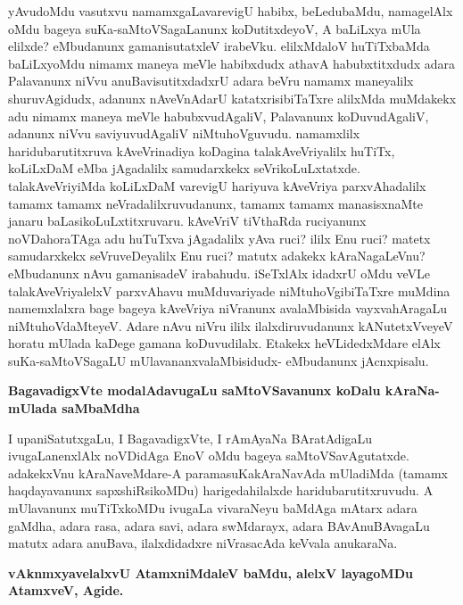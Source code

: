 \noindent
yAvudoMdu vasutxvu namamxgaLavarevigU habibx, beLedubaMdu, namagelAlx oMdu bageya suKa-\-saMtoVSagaLanunx koDutitxdeyoV, A baLiLxya mUla elilxde? eMbudanunx gamanisutatxleV irabeVku. elilxMdaloV huTiTxbaMda baLiLxyoMdu nimamx maneya meVle habibxdudx athavA habubxtitxdudx adara Pala\-vanunx niVvu anuBavisutitxdadxrU adara beVru namamx maneyalilx shuruvAgidudx, adanunx nAveVnAdarU katatxrisi\-biTaTxre alilxMda muMdakekx adu nimamx maneya meVle habubxvudAgaliV, Palavanunx koDuvudA\-galiV, adanunx\- niVvu saviyuvudAgaliV niMtuhoVguvudu. namamxlilx haridubarutitxruva kAveVrinadiya koDagina talakAveVriyalilx huTiTx, koLiLxDaM eMba jAgadalilx samudarxkekx seVrikoLuLxtatxde. talakAveVri\-yiMda koLiLxDaM varevigU hariyuva kAveVriya parxvAhadalilx tamamx tamamx neVradalilxruvudanunx, tamamx tamamx manasisxnaMte janaru baLasikoLuLxtitxruvaru. kAveVriV tiVthaRda ruciyanunx noVDahoraTAga adu huTuTxva jAgadalilx yAva ruci? ililx Enu ruci? matetx samudarxkekx seVruveDeyalilx Enu ruci? matutx adakekx kAraNagaLeVnu? eMbudanunx nAvu gamanisadeV irabahudu. iSeTxlAlx idadxrU oMdu veVLe talakAveVriyalelxV parxvAhavu muMduvariyade niMtuhoVgibiTaTxre muMdina namemxlalxra bage bageya kAveVriya niVranunx avalaMbisida vayxvahAragaLu niMtuhoVdaMteyeV. Adare nAvu niVru ililx ilalxdiruvudanunx kANutetxVveyeV horatu mUlada kaDege gamana koDuvudilalx. Etakekx heVLidedxMdare elAlx suKa-\-saMtoVSagaLU mUlavananxvalaMbisidudx- eMbudanunx jAcnxpisalu.

{\medskip
\noindent
{\large\bf BagavadigxVte modalAdavugaLu saMtoVSavanunx koDalu kAraNa-mUlada saMbaMdha}}\label{page195}
\smallskip

\noindent
I upaniSatutxgaLu, I BagavadigxVte, I rAmAyaNa BAratAdigaLu ivugaLanenxlAlx noVDi\-dAga EnoV oMdu bageya saMtoVSavAgutatxde. adakekxVnu kAraNa\-veMdare-A paramasuKakAraNavAda mUla\-diMda (tamamx haqdayavanunx sapxshiRsi\-koMDu) harigedahilalxde haridubarutitxruvudu. A mUlavanunx muTiTx\-koMDu ivugaLa vivaraNeyu baMdAga mAtarx adara gaMdha, adara rasa, adara savi, adara swMdarayx, adara BAvAnuBAvagaLu matutx adara anuBava, ilalxdidadxre niVrasacAda keVvala anukaraNa.

{\medskip
\noindent
{\large\bf vAknmxyavelalxvU AtamxniMdaleV baMdu, alelxV layagoMDu AtamxveV, Agide.}}\label{195}
\smallskip

